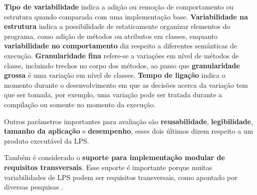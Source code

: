 \textbf{Tipo de variabilidade} indica a adição ou remoção de comportamento ou
estrutura quando comparada com uma implementação base. \textbf{Variabilidade na estrutura}
indica a possibilidade de estaticamente organizar elementos do programa, como adição
de métodos ou atributos em classes, enquanto
\textbf{variabilidade no comportamento} diz respeito a diferentes semânticas de execução.
\textbf{Granularidade fina} refere-se a variações em nível de métodos de classe,
incluindo trechos no corpo dos métodos, ao passo que \textbf{granularidade grossa}
é uma variação em nível de classes. \textbf{Tempo de ligação} indica o momento
durante o desenvolvimento em que as decisões acerca da variação tem que ser tomada,
por exemplo, uma variação pode ser tratada durante a compilação ou somente no momento da execução.

Outros parâmetros importantes para avaliação são \textbf{reusabilidade}, \textbf{legibilidade}, 
\textbf{tamanho da aplicação} e \textbf{desempenho}, esses dois últimos dizem
respeito a um produto executável da LPS. 

Também é considerado o \textbf{suporte para implementação modular de requisitos transversais}.
Esse suporte é importante porque muitas variabilidades de LPS podem ser requisitos transversais,
como apontado por diversas pesquisas \cite{Gacek2001} \cite{Batory2004} \cite{Liu2006}
\cite{Lopez2005} \cite{mezini2004}.

